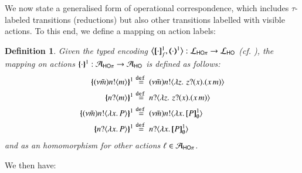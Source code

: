 \documentclass[preprint,11pt]{elsarticle}
\newtheorem{definition}{Definition}[section]
\begin{document}
{%
We now state a generalised form of operational correspondence, which includes $\tau$-labeled transitions (reductions) but also other transitions labelled with visible actions.
To this end, we define a mapping  on action labels: 
\begin{definition}\label{d:actmap1}
Given the typed encoding 
$\enco{\map{\cdot}^{1}_f, \mapt{\cdot}^{1} %
}: \tyl{L}_{\HOp} \to \tyl{L}_{\HO}$ (cf. ),
the mapping on actions $\{\!\!\{\cdot\}\!\!\}^{1}: \mathcal{A}_{\mathsf{HO}\pi} \to \mathcal{A}_{\mathsf{HO}}$
	is defined as follows:
	\begin{align*}
		\mapa{(\nu \tilde{m})\bactout{n}{m}}^{1}
		& \defeq
		(\nu \tilde{m})\bactout{n}{\abs{z}{\,\binp{z}{x} (\appl{x}{m})} }
		\\
		\mapa{\bactinp{n}{m}}^{1}
		& \defeq
		\bactinp{n}{\abs{z}{\,\binp{z}{x} (\appl{x}{m})} }
		\\
		\mapa{(\nu \tilde{m})\bactout{n}{\abs{{x}}{P}}}^{1}
		& \defeq
		(\nu \tilde{m})\bactout{n}{\abs{{x}}{\pmapp{P}{1}{\es}}}
		\\ 
		\mapa{\bactinp{n}{\abs{{x}}{P}}}^{1}
		& \defeq
		\bactinp{n}{\abs{{x}}{\pmapp{P}{1}{\es}}}
	\end{align*}
	and as an homomorphism for other actions $\ell \in \mathcal{A}_{\mathsf{HO}\pi}$.
	\end{definition}
	
	We then have:


}
\end{document}
